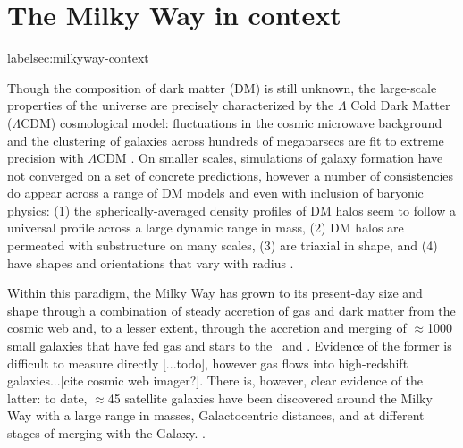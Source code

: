 

\section{The Milky Way in context}label{sec:milkyway-context}

Though the composition of dark matter (DM) is still unknown, the large-scale
properties of the universe are precisely characterized by the $\Lambda$ Cold
Dark Matter ($\Lambda$CDM) cosmological model: fluctuations in the cosmic
microwave background and the clustering of galaxies across hundreds of
megaparsecs are fit to extreme precision with $\Lambda$CDM \citep{planck15,
sanchez12}. On smaller scales, simulations of galaxy formation have not
converged on a set of concrete predictions, however a number of consistencies do
appear across a range of DM models and even with inclusion of baryonic physics:
(1) the spherically-averaged density profiles of DM halos seem to follow a
universal profile across a large dynamic range in mass, (2) DM halos are
permeated with substructure on many scales, (3) are triaxial in shape, and (4)
have shapes and orientations that vary with radius \citep{dubinski91, navarro96,
jing02, kuhlen07, veraciro11}.

Within this paradigm, the Milky Way has grown to its present-day size and shape
through a combination of steady accretion of gas and dark matter from the cosmic
web and, to a lesser extent, through the accretion and merging of $\approx$1000
small galaxies that have fed gas and stars to the \mwdisk\ and \mwhalo. Evidence
of the former is difficult to measure directly [...todo], however gas flows into
high-redshift galaxies...[cite cosmic web imager?]. There is, however, clear
evidence of the latter: to date, $\approx$45 satellite galaxies have been
discovered around the Milky Way with a large range in masses, Galactocentric
distances, and at different stages of merging with the Galaxy. .

